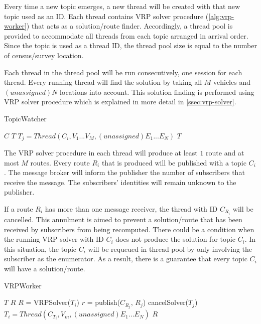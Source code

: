 \documentclass[conference]{IEEEtran}
\begin{document}
Every time a new topic emerges, a new thread will be created with that new topic used as an ID. Each thread contains VRP solver procedure (\autoref{alg:vrp-worker}) that acts as a solution/route finder. Accordingly, a thread pool is provided to accommodate all threads from each topic arranged in arrival order. Since the topic is used as a thread ID, the thread pool size is equal to the number of census/survey location. 


Each thread in the thread pool will be run consecutively, one session for each thread. Every running thread will find the solution by taking all $M$ vehicles and $(unassigned) N$ locations into account. This solution finding is performed using VRP solver procedure which is explained in more detail in \autoref{ssec:vrp-solver}.


\begin{algorithm}[!]
	\caption{TopicWatcher}
	\label{alg:topic-watcher}
	\begin{algorithmic}[1]
		\renewcommand{\algorithmicrequire}{\textbf{Input:}}
		\renewcommand{\algorithmicensure}{\textbf{Output:}}
		\REQUIRE $C$
		\ENSURE  $T$
					\STATE $T_j = Thread(C_i, V_1...V_M, (unassigned) E_1...E_N)$
				\ENDIF
			\ENDFOR
		\ENDFOR
		\RETURN $T$
	\end{algorithmic}
\end{algorithm}


The VRP solver procedure in each thread will produce at least $1$ route and at most $M$ routes. Every route $R_i$ that is produced will be published with a topic $C_i$. The message broker will inform the publisher the number of subscribers that receive the message. The subscribers' identities will remain unknown to the publisher. 


If a route $R_i$ has more than one message receiver, the thread with ID $C_{R_i}$ will be cancelled. This annulment is aimed to prevent a solution/route that has been received by subscribers from being recomputed. There could be a condition when the running VRP solver with ID $C_i$ does not produce the solution for topic $C_i$. In this situation, the topic $C_i$ will be requeued in thread pool by only involving the subscriber as the enumerator. As a result, there is a guarantee that every topic $C_i$ will have a solution/route. 


\begin{algorithm}[!]
	\caption{VRPWorker}
	\label{alg:vrp-worker}
	\begin{algorithmic}[1]
		\renewcommand{\algorithmicrequire}{\textbf{Input:}}
		\renewcommand{\algorithmicensure}{\textbf{Output:}}
		\REQUIRE $T$
		\ENSURE  $R$
			\STATE $R$ = VRPSolver($T_i$)
				\STATE $r$ = publish($C_{R_j}$, $R_j$)
					\STATE cancelSolver($T_j$)
					\STATE $T_i = Thread(C_{T_i}, V_m, (unassigned) E_1...E_N)$
				\ENDIF
			\ENDFOR
		\ENDFOR
		\RETURN $R$
	\end{algorithmic}
\end{algorithm}
\end{document}

